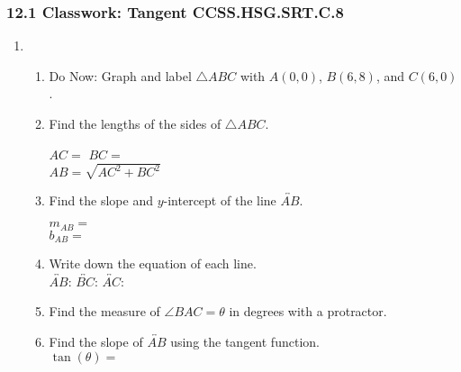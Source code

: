 

\fancyhead[LE]{\thepage}



\subsubsection*{12.1 Classwork: Tangent \hfill CCSS.HSG.SRT.C.8}
\begin{enumerate}
  \item \begin{enumerate}
    \item Do Now: Graph and label $\triangle ABC$ with $A(0,0)$, $B(6,8)$, and $C(6,0)$.
    \begin{center}
    \end{center}
    \item Find the lengths of the sides of $\triangle ABC$.
    \begin{multicols}{2}
      $AC=$ \hspace{3cm}
      $BC=$ \\[1cm]
      $AB=\sqrt{AC^2+BC^2}$
    \end{multicols} \vspace{2.5cm}
    \item Find the slope and $y$-intercept of the line $\overleftrightarrow{AB}$.
      \begin{multicols}{2}
        $m_{AB}=$ \\
        $b_{AB}=$
      \end{multicols} \vspace{0.25cm}
    \item Write down the equation of each line. \\[0.5cm]
      $\overleftrightarrow{AB}$: \hfill
      $\overleftrightarrow{BC}$: \hfill
      $\overleftrightarrow{AC}$: \hspace{2cm}
    \vspace{1cm}
    \item Find the measure of $\angle BAC=\theta$ in degrees with a protractor. \vspace{0.5cm}
    \item Find the slope of $\overleftrightarrow{AB}$ using the tangent function.\\[0.5cm]
    $\displaystyle \tan(\theta)=$
  \end{enumerate}


\end{enumerate}
